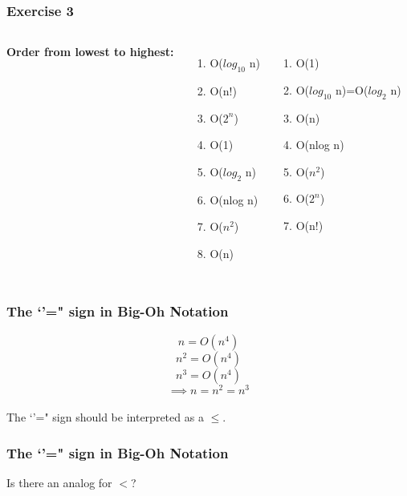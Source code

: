 \documentclass{beamer}
\begin{document}
\begin{frame}
\frametitle{Exercise 3}
\begin{columns}[c] %

\textbf{Order from lowest to highest: }
\begin{enumerate}[I]
\item O($log_{10}$ n)
\item  O(n!) 
\item O($2^{n}$) 
\item O(1) 
\item O($log_{2}$ n) 
\item O(nlog n) 
\item O($n^{2}$) 
\item O(n)
\end{enumerate}

\begin{enumerate}

\item   O(1) 
\pause
\item O($log_{10}$ n)=O($log_{2}$ n)
\pause
\item   O(n) 
\pause
\item  O(nlog n) 
\pause
\item  O($n^{2}$)  
\pause
\item  O($2^{n}$)
\pause
\item  O(n!)
\end{enumerate}
\end{columns}
\end{frame}


\begin{frame}
\frametitle{  The `'=" sign in Big-Oh Notation}

$$n = O(n^{4})$$ 
$$n^{2} = O(n^{4})$$
$$n^{3} = O(n^{4})$$
$$\implies n = n^{2} = n^{3}$$ \\


The `'=" sign should be interpreted as a $\le$.

\end{frame}


\begin{frame}
\frametitle{ The `'="  sign in Big-Oh Notation}
\begin{center}
Is there an analog for $<$?
\end{center}
\end{frame}
\end{document}
